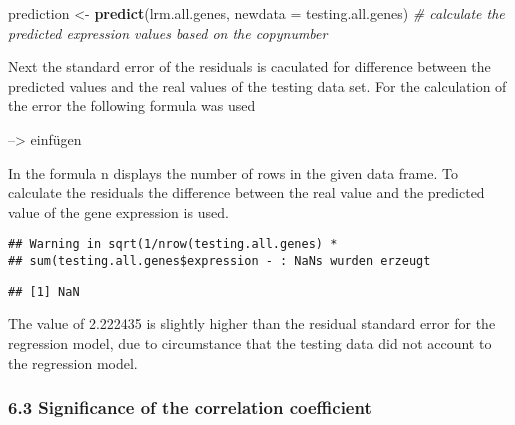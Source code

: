 \documentclass[]{article}
\newenvironment{Shaded}{\begin{snugshade}}{\end{snugshade}}
\newcommand{\CommentTok}[1]{\textcolor[rgb]{0.56,0.35,0.01}{\textit{#1}}}
\newcommand{\DataTypeTok}[1]{\textcolor[rgb]{0.13,0.29,0.53}{#1}}
\newcommand{\DecValTok}[1]{\textcolor[rgb]{0.00,0.00,0.81}{#1}}
\newcommand{\KeywordTok}[1]{\textcolor[rgb]{0.13,0.29,0.53}{\textbf{#1}}}
\newcommand{\NormalTok}[1]{#1}
\newcommand{\OperatorTok}[1]{\textcolor[rgb]{0.81,0.36,0.00}{\textbf{#1}}}
\newcommand{\StringTok}[1]{\textcolor[rgb]{0.31,0.60,0.02}{#1}}
\begin{document}
\begin{Shaded}
\begin{Highlighting}[]
\NormalTok{prediction <-}\StringTok{ }\KeywordTok{predict}\NormalTok{(lrm.all.genes, }\DataTypeTok{newdata =}\NormalTok{ testing.all.genes) }\CommentTok{# calculate the predicted expression values based on the copynumber}
\end{Highlighting}
\end{Shaded}

Next the standard error of the residuals is caculated for difference
between the predicted values and the real values of the testing data
set. For the calculation of the error the following formula was used

--\textgreater{} einfügen

In the formula n displays the number of rows in the given data frame. To
calculate the residuals the difference between the real value and the
predicted value of the gene expression is used.

\begin{Shaded}
\end{Shaded}

\begin{verbatim}
## Warning in sqrt(1/nrow(testing.all.genes) *
## sum(testing.all.genes$expression - : NaNs wurden erzeugt
\end{verbatim}

\begin{verbatim}
## [1] NaN
\end{verbatim}

The value of 2.222435 is slightly higher than the residual standard
error for the regression model, due to circumstance that the testing
data did not account to the regression model.

\hypertarget{significance-of-the-correlation-coefficient}{%
\subsubsection{6.3 Significance of the correlation
coefficient}\label{significance-of-the-correlation-coefficient}}
\end{document}
